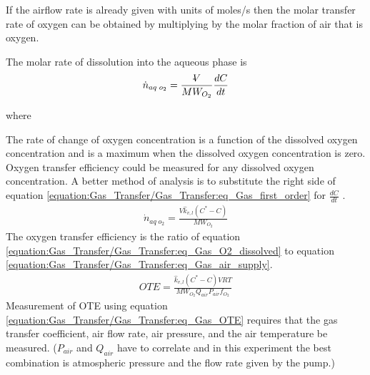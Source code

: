 \documentclass[letterpaper,10pt,english]{sphinxmanual}
\begin{document}
If the airflow rate is already given with units of moles/s then the molar transfer rate of oxygen can be obtained by multiplying by the molar fraction of air that is oxygen.

The molar rate of dissolution into the aqueous phase is
\begin{equation}\label{equation:Gas_Transfer/Gas_Transfer:Gas_Transfer/Gas_Transfer:3}
\begin{split}\dot{n}_{aq\; o_{2} } =\frac{\rlap{-} V}{MW_{O_{2} } } \frac{dC}{dt}\end{split}
\end{equation}\begin{description}
\item[{where}] \leavevmode
{}

\end{description}

The rate of change of oxygen concentration is a function of the dissolved oxygen concentration and is a maximum when the dissolved oxygen concentration is zero. Oxygen transfer efficiency could be measured for any dissolved oxygen concentration. A better method of analysis is to substitute the right side of equation \eqref{equation:Gas_Transfer/Gas_Transfer:eq_Gas_first_order} for \(\frac{dC}{dt}\) .
\begin{equation}\label{equation:Gas_Transfer/Gas_Transfer:eq_Gas_O2_dissolved}
\begin{split}\dot{n}_{aq\; o_{2} } =\frac{V\hat{k}_{v,l} \left(C^{*} -C\right)}{MW_{O_{2} } }\end{split}
\end{equation}
The oxygen transfer efficiency is the ratio of equation \eqref{equation:Gas_Transfer/Gas_Transfer:eq_Gas_O2_dissolved} to equation \eqref{equation:Gas_Transfer/Gas_Transfer:eq_Gas_air_supply}.
\begin{equation}\label{equation:Gas_Transfer/Gas_Transfer:eq_Gas_OTE}
\begin{split}OTE=\frac{\hat{k}_{v,l} \left(C^{*} -C\right)VRT}{MW_{O_{2} } Q_{air} P_{air} f_{O_{2} } }\end{split}
\end{equation}
Measurement of OTE using equation \eqref{equation:Gas_Transfer/Gas_Transfer:eq_Gas_OTE} requires that the gas transfer coefficient, air flow rate, air pressure, and the air temperature be measured. (\(P_{air}\) and \(Q_{air}\) have to correlate and in this experiment the best combination is atmospheric pressure and the flow rate given by the pump.)
\end{document}
